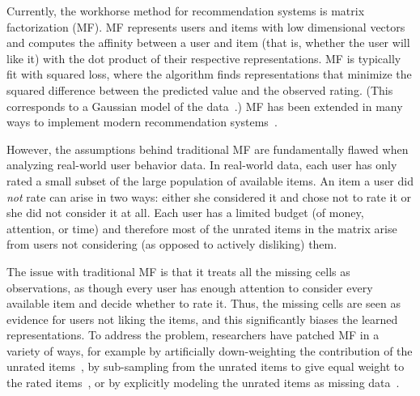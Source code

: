 

Currently, the workhorse method for recommendation systems is matrix
factorization (MF). MF represents users and items with low dimensional
vectors and computes the affinity between a user and item (that is,
whether the user will like it) with the dot product of their
respective representations.  MF is typically fit with squared loss,
where the algorithm finds representations that minimize the squared
difference between the predicted value and the observed rating.  (This
corresponds to a Gaussian model of the
data~\cite{Salakhutdinov:2008}.)  MF has been extended in many ways to
implement modern recommendation
systems~\cite{Dror:2012,Koren:2008,Rendle:2009,Stern:2009p9238}.

However, the assumptions behind traditional MF are fundamentally
flawed when analyzing real-world user behavior data.  In real-world
data, each user has only rated a small subset of the large population
of available items. An item a user did \textit{not} rate can arise in
two ways: either she considered it and chose not to rate it or she did
not consider it at all.  Each user has a limited budget (of money,
attention, or time) and therefore most of the unrated items in the
matrix arise from users not considering (as opposed to actively disliking) them.

The issue with traditional MF is that it treats all the missing cells
as observations, as though every user has enough attention to consider
every available item and decide whether to rate it.  Thus, the missing
cells are seen as evidence for users not liking the items, and this
significantly biases the learned representations.  To address the
problem, researchers have patched MF in a variety of ways, for example
by artificially down-weighting the contribution of the unrated items~\cite{Hu:2008p9402},
by sub-sampling from the unrated items to give equal weight to the
rated items~\cite{Gantner:2012p9364,Dror:2012a}, or by explicitly modeling the unrated
items as missing data~\cite{Paquet:2013p9197}.

